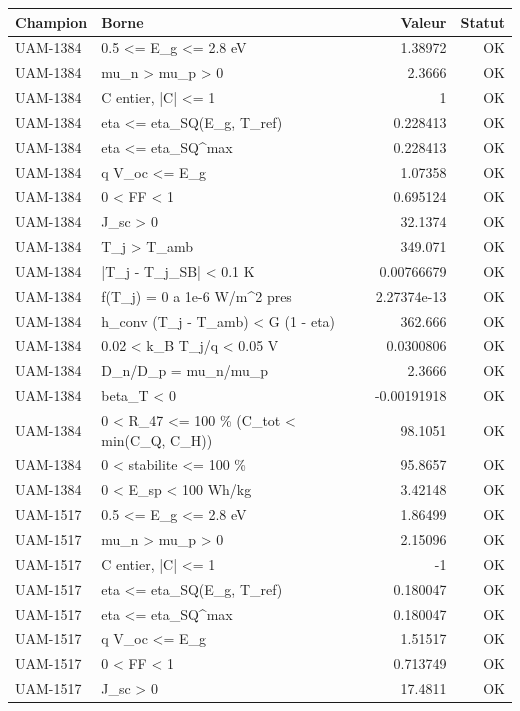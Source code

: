 \documentclass[11pt,a4paper,french]{article}
\begin{document}
\begin{table}[htbp]
\centering
\footnotesize
\begin{tabular}{llrr}
\toprule
Champion & Borne & Valeur & Statut \\
\midrule
UAM-1384 & 0.5 <= E\_g <= 2.8 eV & 1.38972 & OK \\
UAM-1384 & mu\_n > mu\_p > 0 & 2.3666 & OK \\
UAM-1384 & C entier, |C| <= 1 & 1 & OK \\
UAM-1384 & eta <= eta\_SQ(E\_g, T\_ref) & 0.228413 & OK \\
UAM-1384 & eta <= eta\_SQ\textasciicircum{}max & 0.228413 & OK \\
UAM-1384 & q V\_oc <= E\_g & 1.07358 & OK \\
UAM-1384 & 0 < FF < 1 & 0.695124 & OK \\
UAM-1384 & J\_sc > 0 & 32.1374 & OK \\
UAM-1384 & T\_j > T\_amb & 349.071 & OK \\
UAM-1384 & |T\_j - T\_j\_SB| < 0.1 K & 0.00766679 & OK \\
UAM-1384 & f(T\_j) = 0 a 1e-6 W/m\textasciicircum{}2 pres & 2.27374e-13 & OK \\
UAM-1384 & h\_conv (T\_j - T\_amb) < G (1 - eta) & 362.666 & OK \\
UAM-1384 & 0.02 < k\_B T\_j/q < 0.05 V & 0.0300806 & OK \\
UAM-1384 & D\_n/D\_p = mu\_n/mu\_p & 2.3666 & OK \\
UAM-1384 & beta\_T < 0 & -0.00191918 & OK \\
UAM-1384 & 0 < R\_47 <= 100 \% (C\_tot < min(C\_Q, C\_H)) & 98.1051 & OK \\
UAM-1384 & 0 < stabilite <= 100 \% & 95.8657 & OK \\
UAM-1384 & 0 < E\_sp < 100 Wh/kg & 3.42148 & OK \\
UAM-1517 & 0.5 <= E\_g <= 2.8 eV & 1.86499 & OK \\
UAM-1517 & mu\_n > mu\_p > 0 & 2.15096 & OK \\
UAM-1517 & C entier, |C| <= 1 & -1 & OK \\
UAM-1517 & eta <= eta\_SQ(E\_g, T\_ref) & 0.180047 & OK \\
UAM-1517 & eta <= eta\_SQ\textasciicircum{}max & 0.180047 & OK \\
UAM-1517 & q V\_oc <= E\_g & 1.51517 & OK \\
UAM-1517 & 0 < FF < 1 & 0.713749 & OK \\
UAM-1517 & J\_sc > 0 & 17.4811 & OK \\

\end{tabular}
\end{table}
\end{document}
